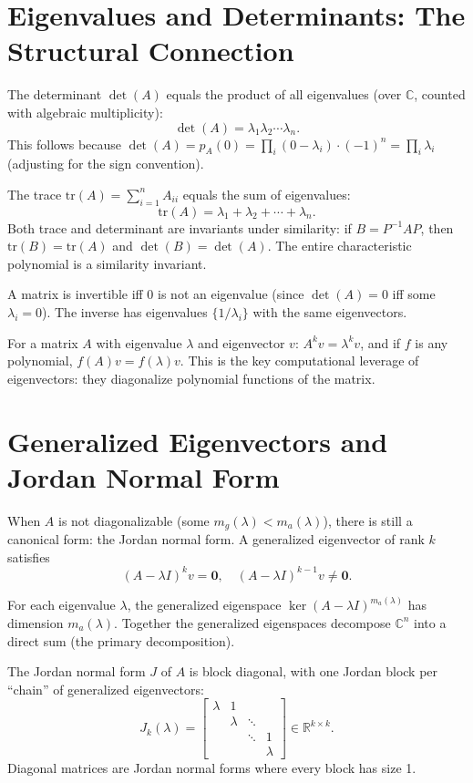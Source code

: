 \documentclass[11pt]{article}
\begin{document}
\section*{Eigenvalues and Determinants: The Structural Connection}

The determinant $\det(A)$ equals the product of all eigenvalues (over $\mathbb{C}$, counted with algebraic multiplicity):
\[
\det(A) = \lambda_1 \lambda_2 \cdots \lambda_n.
\]
This follows because $\det(A) = p_A(0) = \prod_i (0 - \lambda_i) \cdot (-1)^n = \prod_i \lambda_i$ (adjusting for the sign convention).

The trace $\text{tr}(A) = \sum_{i=1}^n A_{ii}$ equals the sum of eigenvalues:
\[
\text{tr}(A) = \lambda_1 + \lambda_2 + \cdots + \lambda_n.
\]
Both trace and determinant are invariants under similarity: if $B = P^{-1}AP$, then $\text{tr}(B) = \text{tr}(A)$ and $\det(B) = \det(A)$. The entire characteristic polynomial is a similarity invariant.

A matrix is invertible iff 0 is not an eigenvalue (since $\det(A) = 0$ iff some $\lambda_i = 0$). The inverse has eigenvalues $\{1/\lambda_i\}$ with the same eigenvectors.

For a matrix $A$ with eigenvalue $\lambda$ and eigenvector $v$: $A^k v = \lambda^k v$, and if $f$ is any polynomial, $f(A) v = f(\lambda) v$. This is the key computational leverage of eigenvectors: they diagonalize polynomial functions of the matrix.

\section*{Generalized Eigenvectors and Jordan Normal Form}

When $A$ is not diagonalizable (some $m_g(\lambda) < m_a(\lambda)$), there is still a canonical form: the Jordan normal form. A generalized eigenvector of rank $k$ satisfies
\[
(A - \lambda I)^k v = \mathbf{0}, \quad (A - \lambda I)^{k-1} v \neq \mathbf{0}.
\]

For each eigenvalue $\lambda$, the generalized eigenspace $\ker(A - \lambda I)^{m_a(\lambda)}$ has dimension $m_a(\lambda)$. Together the generalized eigenspaces decompose $\mathbb{C}^n$ into a direct sum (the primary decomposition).

The Jordan normal form $J$ of $A$ is block diagonal, with one Jordan block per ``chain'' of generalized eigenvectors:
\[
J_k(\lambda) = \begin{bmatrix} \lambda & 1 & & \\ & \lambda & \ddots & \\ & & \ddots & 1 \\ & & & \lambda \end{bmatrix} \in \mathbb{R}^{k \times k}.
\]
Diagonal matrices are Jordan normal forms where every block has size 1.
\end{document}
